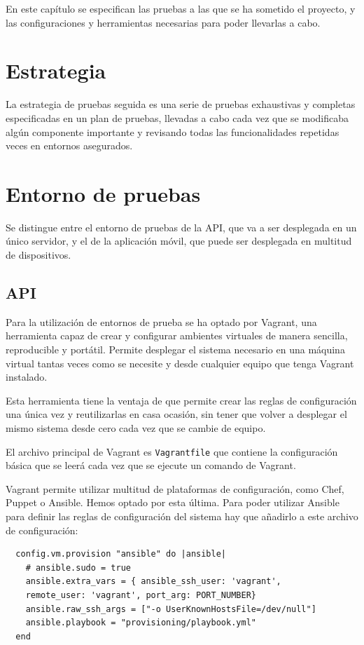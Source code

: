 En este capítulo se especifican las pruebas a las que se ha sometido el proyecto,
y las configuraciones y herramientas necesarias para poder llevarlas a cabo.

\section{Estrategia}

La estrategia de pruebas seguida es una serie de pruebas exhaustivas y
completas especificadas en un plan de pruebas, llevadas a cabo cada vez que se
modificaba algún componente importante y revisando todas las funcionalidades
repetidas veces en entornos asegurados.

\section{Entorno de pruebas}

Se distingue entre el entorno de pruebas de la API, que va a ser desplegada en
un único servidor, y el de la aplicación móvil, que puede ser desplegada en
multitud de dispositivos.

\subsection{API}

Para la utilización de entornos de prueba se ha optado por Vagrant, una
herramienta capaz de crear y configurar ambientes virtuales de manera sencilla,
reproducible y portátil. Permite desplegar el sistema necesario en una máquina
virtual tantas veces como se necesite y desde cualquier equipo que tenga Vagrant
instalado.

Esta herramienta tiene la ventaja de que permite crear las reglas de
configuración una única vez y reutilizarlas en casa ocasión, sin tener que volver
a desplegar el mismo sistema desde cero cada vez que se cambie de equipo.

El archivo principal de Vagrant es \texttt{Vagrantfile} que contiene la
configuración básica que se leerá cada vez que se ejecute un comando de Vagrant.

Vagrant permite utilizar multitud de plataformas de configuración, como Chef,
Puppet o Ansible. Hemos optado por esta última. Para poder utilizar Ansible para
definir las reglas de configuración del sistema hay que añadirlo a este archivo
de configuración:

\begin{verbatim}
  config.vm.provision "ansible" do |ansible|
    # ansible.sudo = true
    ansible.extra_vars = { ansible_ssh_user: 'vagrant',
    remote_user: 'vagrant', port_arg: PORT_NUMBER}
    ansible.raw_ssh_args = ["-o UserKnownHostsFile=/dev/null"]
    ansible.playbook = "provisioning/playbook.yml"
  end
\end{verbatim}

